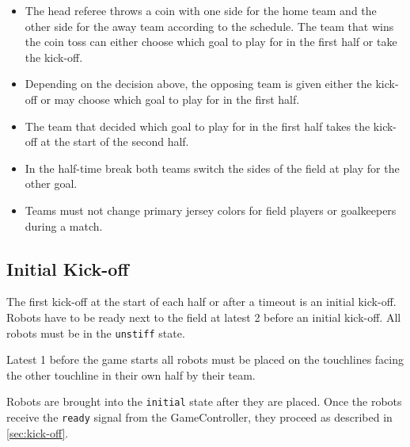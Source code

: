\begin{itemize}
  \item The head referee throws a coin with one side for the home team and the other side for the away team according to the schedule.
    The team that wins the coin toss can either choose which goal to play for in the first half or take the kick-off.
  \item Depending on the decision above, the opposing team is given either the kick-off or may choose which goal to play for in the first half.
  \item The team that decided which goal to play for in the first half takes the kick-off at the start of the second half.
  \item In the half-time break both teams switch the sides of the field at play for the other goal.
  \item Teams must not change primary jersey colors for field players or goalkeepers during a match.
\end{itemize}

\subsection{Initial Kick-off}
\label{sec:initial-kick-off}

The first kick-off at the start of each half or after a timeout is an initial kick-off.
Robots have to be ready next to the field at latest \qty{2}{\min} before an initial kick-off.
All robots must be in the \texttt{unstiff} state.

Latest \qty{1}{\min} before the game starts all robots must be placed on the touchlines facing the other touchline in their own half by their team.

Robots are brought into the \texttt{initial} state after they are placed.
Once the robots receive the \texttt{ready} signal from the GameController, they proceed as described in \cref{sec:kick-off}.


